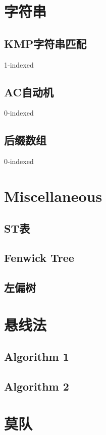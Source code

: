 \documentclass{article}
\begin{document}
	\newpage

	\section{字符串}
		\subsection{KMP字符串匹配}
		1-indexed
		\subsection{AC自动机}
		0-indexed
		
		\subsection{后缀数组}
		0-indexed
		

	\newpage

	\section{Miscellaneous}
		\subsection{ST表}
		\subsection{Fenwick Tree}
		
		\subsection{左偏树}
		
	\newpage

	\section{悬线法}
		\subsection{Algorithm 1}
		\subsection{Algorithm 2}

	\newpage

	\section{莫队}
\end{document}
